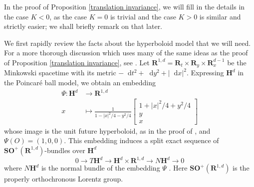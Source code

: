 \documentclass[reqno,11pt]{amsart}
\newcommand{\RR}{\mathbf{R}}
\newcommand{\Hyp}{\mathbf H}
\newcommand{\SpOrth}{\mathbf{SO}}
\newcommand*\dif{\mathop{}\!\mathrm{d}}
\theoremstyle{definition}
\numberwithin{equation}{section}
\begin{document}
In the proof of Proposition \ref{translation invariance}, we will fill in the details in the case $K < 0$, as the case $K = 0$ is trivial and the case $K > 0$ is similar and strictly easier; we shall briefly remark on that later.

We first rapidly review the facts about the hyperboloid model that we will need.
For a more thorough discussion which uses many of the same ideas as the proof of Proposition \ref{translation invariance}, see \cite[\S3.1, \S4.1]{daskalopoulosPrep1}.
Let $\RR^{1, d} = \RR_t \times \RR_y \times \RR_x^{d - 1}$ be the Minkowski spacetime with its metric $-\dif t^2 + \dif y^2 + |\dif x|^2$.
Expressing $\Hyp^d$ in the Poincar\'e ball model, we obtain an embedding
\begin{align*}
\Psi: \Hyp^d &\to \RR^{1, d} \\
x &\mapsto \frac{1}{1 - |x|^2/4 - y^2/4} \begin{bmatrix}1 + |x|^2/4 + y^2/4\\y \\ x\end{bmatrix}
\end{align*}
whose image is the unit future hyperboloid, as in the proof of \cite[Proposition 3.5]{lee1997riemannian}, and $\Psi(O) = (1, 0, 0)$.
This embedding induces a split exact sequence of $\SpOrth^+(\RR^{1, d})$-bundles over $\Hyp^d$
\begin{equation}\label{splitting of tangent bundle}
0 \to T\Hyp^d \to \Hyp^d \times \RR^{1, d} \to N\Hyp^d \to 0
\end{equation}
where $N\Hyp^d$ is the normal bundle of the embedding $\Psi$ \cite[(3.4)]{daskalopoulosPrep1}.
Here $\SpOrth^+(\RR^{1, d})$ is the properly orthochronous Lorentz group.
\end{document}
